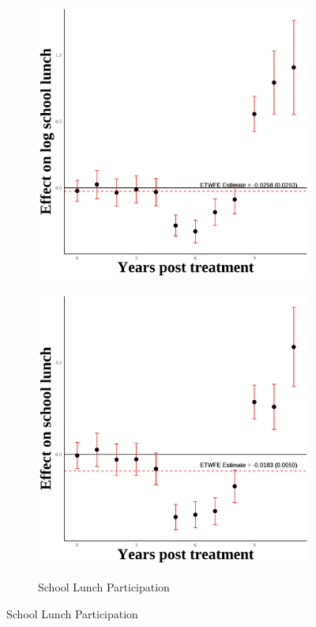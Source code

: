 \documentclass[12pt,english]{article}
\begin{document}
\begin{figure}[H]
\begin{subfigure}[b]{0.3\textwidth}
    \includegraphics[width=\linewidth]{figures/plot66-ln_schl_lunch_event_study-third-two.png}
    \label{fig:ln-schl-lunch-third-two}
  \end{subfigure}
  \hfill
  \begin{subfigure}[b]{0.3\textwidth}
    \centering
    \caption{School Lunch Participation}
    \includegraphics[width=\linewidth]{figures/plot67-schl_lunch_event_study-third-two.png}
    \label{fig:schl-lunch-third-two}
  \end{subfigure}


\end{figure}
\end{document}
